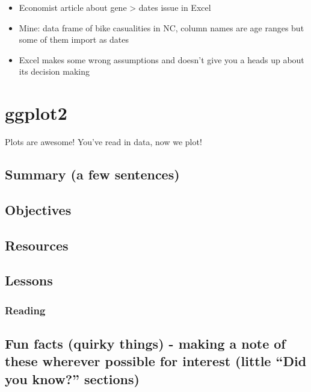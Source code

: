 \documentclass[]{book}
\providecommand{\tightlist}{%
  \setlength{\itemsep}{0pt}\setlength{\parskip}{0pt}}
\begin{document}
\begin{itemize}
\tightlist
\item
  Economist article about gene \textgreater{} dates issue in Excel
\item
  Mine: data frame of bike casualities in NC, column names are age ranges but some of them import as dates
\item
  Excel makes some wrong assumptions and doesn't give you a heads up about its decision making
\end{itemize}

\hypertarget{ggplot2}{%
\chapter{ggplot2}\label{ggplot2}}

Plots are awesome! You've read in data, now we plot!

\hypertarget{summary-a-few-sentences-3}{%
\section{Summary (a few sentences)}\label{summary-a-few-sentences-3}}

\hypertarget{objectives-2}{%
\section{Objectives}\label{objectives-2}}

\hypertarget{resources-4}{%
\section{Resources}\label{resources-4}}

\hypertarget{lessons-1}{%
\section{Lessons}\label{lessons-1}}

\hypertarget{reading-1}{%
\subsection{Reading}\label{reading-1}}

\hypertarget{fun-facts-quirky-things---making-a-note-of-these-wherever-possible-for-interest-little-did-you-know-sections-2}{%
\section{Fun facts (quirky things) - making a note of these wherever possible for interest (little ``Did you know?'' sections)}\label{fun-facts-quirky-things---making-a-note-of-these-wherever-possible-for-interest-little-did-you-know-sections-2}}
\end{document}
